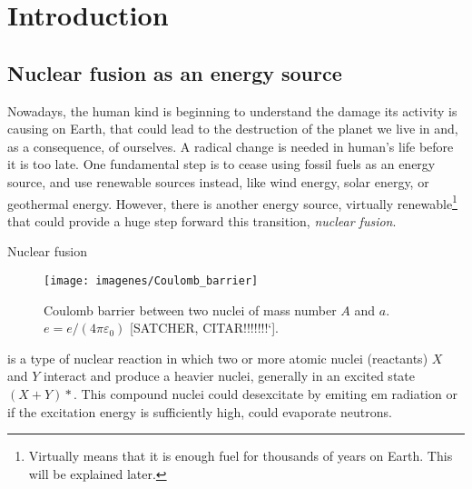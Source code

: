 \documentclass[a4paper,12pt,oneside]{book}
\begin{document}




\chapter{Introduction}


\section[Nuclear fusion]{Nuclear fusion as an energy source}

%

Nowadays, the human kind is beginning to understand the damage its activity is causing on Earth, that could lead to the destruction of the planet we live in and, as a consequence, of ourselves. A radical change is needed in human's life before it is too late. One fundamental step is to cease using fossil fuels as an energy source, and  use renewable sources instead, like wind energy, solar energy, or geothermal energy. However, there is another energy source, virtually renewable\footnote{Virtually means that it is enough fuel for thousands of years on Earth. This will be explained later.} that could provide a huge step forward this transition,  \textit{nuclear fusion}.


Nuclear fusion
%
\begin{wrapfigure}{r}{10cm}
\centering
\texttt{[image: imagenes/Coulomb\_barrier]}
\caption{Coulomb barrier between two nuclei of mass number $A$ and $a$. $e=e/(4 \pi \varepsilon_0)$ [SATCHER, CITAR!!!!!!!`].}
\label{fig_Coulomb_barrier}
\end{wrapfigure} 
%
is a type of nuclear reaction in which two or more atomic nuclei (reactants) $X$ and $Y$ interact and produce a heavier nuclei, generally in an excited state $(X+Y)*$. This compound nuclei could desexcitate by emiting em radiation or if the excitation energy is sufficiently high, could evaporate neutrons.
\end{document}
